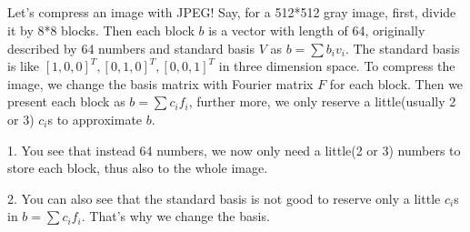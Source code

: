 \documentclass{article}
\begin{document}
\begin{spacing}{1.5}
\section{}
\hspace*{0.5cm} Let's compress an image with JPEG! Say, for a 512*512 gray image, first, divide it by 8*8 blocks. Then each block $b$ is a vector with length of 64, originally described by 64 numbers and standard basis $V$ as $b=\sum b_i v_i$. The standard basis is like $[1, 0, 0]^T, [0, 1, 0]^T, [0, 0, 1]^T$ in three dimension space. To compress the image, we change the basis matrix with Fourier matrix $F$ for each block. Then we present each block as $b=\sum c_i f_i$, further more, we only reserve a little(usually 2 or 3) $c_i$s to approximate $b$. 

1. You see that instead 64 numbers, we now only need a little(2 or 3) numbers to store each block, thus also to the whole image. 

2.  You can also see that the standard basis is not good to reserve only a little $c_i$s in $b=\sum c_i f_i$. That's why we change the basis.


\end{spacing}
\end{document}
